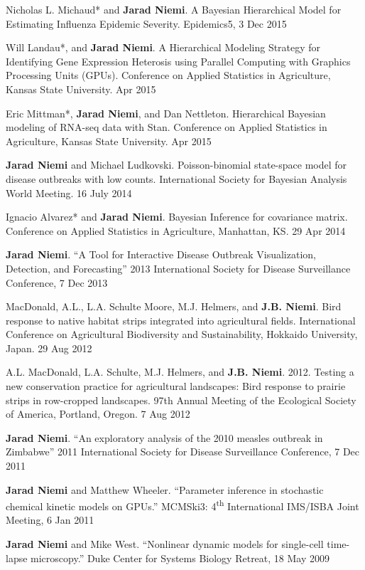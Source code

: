 \documentclass[overlapped,line]{res}
\newcommand{\sinceappt}{}
\begin{document}
\begin{resume}
{Nicholas L. Michaud* and {\bf Jarad Niemi}. A Bayesian Hierarchical Model for Estimating Influenza Epidemic Severity. Epidemics5, 3 Dec 2015

Will Landau*, and {\bf Jarad Niemi}. A Hierarchical Modeling Strategy for Identifying Gene Expression Heterosis using Parallel Computing with Graphics Processing Units (GPUs). Conference on Applied Statistics in Agriculture, Kansas State University. Apr 2015

Eric Mittman*, {\bf Jarad Niemi}, and Dan Nettleton. Hierarchical Bayesian modeling of RNA-seq data with Stan. Conference on Applied Statistics in Agriculture, Kansas State University. Apr 2015

{\bf Jarad Niemi} and Michael Ludkovski. Poisson-binomial state-space model for disease outbreaks with low counts. International Society for Bayesian Analysis World Meeting. 16 July 2014 


Ignacio Alvarez* and {\bf Jarad Niemi}. Bayesian Inference for covariance matrix. Conference on Applied Statistics in Agriculture, Manhattan, KS. 29 Apr 2014 

{\bf Jarad Niemi}. ``A Tool for Interactive Disease Outbreak Visualization, Detection, and Forecasting'' 2013 International Society for Disease Surveillance Conference, 7 Dec 2013

MacDonald, A.L., L.A. Schulte Moore, M.J. Helmers, and {\bf J.B. Niemi}.  Bird response to native habitat strips integrated into agricultural fields.  International Conference on Agricultural Biodiversity and Sustainability, Hokkaido University, Japan.  29 Aug 2012 

A.L. MacDonald, L.A. Schulte, M.J. Helmers, and {\bf J.B. Niemi}.  2012.  Testing a new conservation practice for agricultural landscapes: Bird response to prairie strips in row-cropped landscapes.  97th Annual Meeting of the Ecological Society of America, Portland, Oregon. 7 Aug 2012 

\sinceappt

{\bf Jarad Niemi}. ``An exploratory analysis of the 2010 measles outbreak in Zimbabwe'' 2011 International Society for Disease Surveillance Conference, 7 Dec 2011 

{\bf Jarad Niemi} and Matthew Wheeler. ``Parameter inference in stochastic chemical kinetic models on GPUs.'' MCMSki3: 4\textsuperscript{th} International IMS/ISBA Joint Meeting, 6 Jan 2011

{\bf Jarad Niemi} and Mike West. ``Nonlinear dynamic models for single-cell time-lapse microscopy.'' Duke Center for Systems Biology Retreat, 18 May 2009

}
\end{resume}
\end{document}
